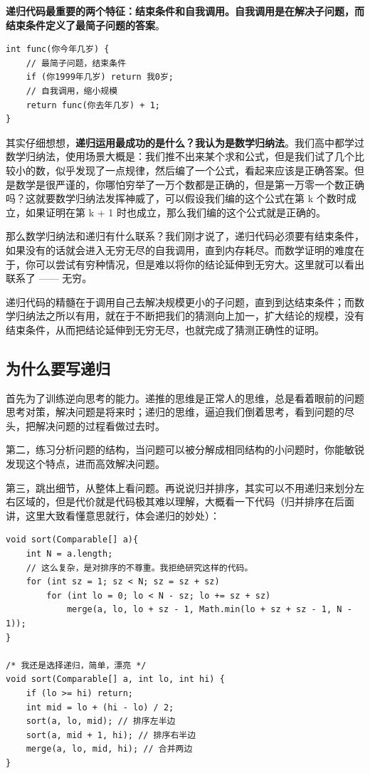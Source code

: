 \documentclass[12pt]{article}
\begin{document}
\textbf{递归代码最重要的两个特征：结束条件和自我调用。自我调用是在解决子问题，而结束条件定义了最简子问题的答案}。
\begin{lstlisting}
int func(你今年几岁) {
    // 最简子问题，结束条件
    if (你1999年几岁) return 我0岁;
    // 自我调用，缩小规模
    return func(你去年几岁) + 1;   
}
\end{lstlisting}

其实仔细想想，\textbf{递归运用最成功的是什么？我认为是数学归纳法}。我们高中都学过数学归纳法，使用场景大概是：我们推不出来某个求和公式，但是我们试了几个比较小的数，似乎发现了一点规律，然后编了一个公式，看起来应该是正确答案。但是数学是很严谨的，你哪怕穷举了一万个数都是正确的，但是第一万零一个数正确吗？这就要数学归纳法发挥神威了，可以假设我们编的这个公式在第 k 个数时成立，如果证明在第 k + 1 时也成立，那么我们编的这个公式就是正确的。

那么数学归纳法和递归有什么联系？我们刚才说了，递归代码必须要有结束条件，如果没有的话就会进入无穷无尽的自我调用，直到内存耗尽。而数学证明的难度在于，你可以尝试有穷种情况，但是难以将你的结论延伸到无穷大。这里就可以看出联系了 —— 无穷。

递归代码的精髓在于调用自己去解决规模更小的子问题，直到到达结束条件；而数学归纳法之所以有用，就在于不断把我们的猜测向上加一，扩大结论的规模，没有结束条件，从而把结论延伸到无穷无尽，也就完成了猜测正确性的证明。

\subsection{为什么要写递归}
首先为了训练逆向思考的能力。递推的思维是正常人的思维，总是看着眼前的问题思考对策，解决问题是将来时；递归的思维，逼迫我们倒着思考，看到问题的尽头，把解决问题的过程看做过去时。

第二，练习分析问题的结构，当问题可以被分解成相同结构的小问题时，你能敏锐发现这个特点，进而高效解决问题。

第三，跳出细节，从整体上看问题。再说说归并排序，其实可以不用递归来划分左右区域的，但是代价就是代码极其难以理解，大概看一下代码（归并排序在后面讲，这里大致看懂意思就行，体会递归的妙处）：
\begin{lstlisting}
void sort(Comparable[] a){    
    int N = a.length;
    // 这么复杂，是对排序的不尊重。我拒绝研究这样的代码。
    for (int sz = 1; sz < N; sz = sz + sz)
        for (int lo = 0; lo < N - sz; lo += sz + sz)
            merge(a, lo, lo + sz - 1, Math.min(lo + sz + sz - 1, N - 1));
}

/* 我还是选择递归，简单，漂亮 */
void sort(Comparable[] a, int lo, int hi) {
    if (lo >= hi) return;
    int mid = lo + (hi - lo) / 2;
    sort(a, lo, mid); // 排序左半边
    sort(a, mid + 1, hi); // 排序右半边
    merge(a, lo, mid, hi); // 合并两边
}
\end{lstlisting}
\end{document}
